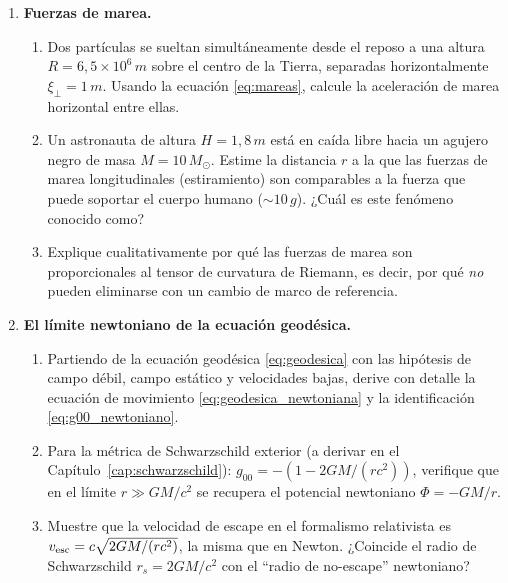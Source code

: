 \begin{enumerate}[leftmargin=2em, label=\textbf{P\thechapter.\arabic*.}]
  \item \textbf{Fuerzas de marea.}
  \begin{enumerate}[label=(\alph*)]
    \item Dos partículas se sueltan simultáneamente desde el reposo a una altura $R = 6{,}5\times10^6\,\si{m}$ sobre el centro de la Tierra, separadas horizontalmente $\xi_\perp = 1\,\si{m}$. Usando la ecuación \eqref{eq:mareas}, calcule la aceleración de marea horizontal entre ellas.
    \item Un astronauta de altura $H = 1{,}8\,\si{m}$ está en caída libre hacia un agujero negro de masa $M = 10\,M_\odot$. Estime la distancia $r$ a la que las fuerzas de marea longitudinales (estiramiento) son comparables a la fuerza que puede soportar el cuerpo humano ($\sim 10\,g$). ¿Cuál es este fenómeno conocido como?
    \item Explique cualitativamente por qué las fuerzas de marea son proporcionales al tensor de curvatura de Riemann, es decir, por qué \emph{no} pueden eliminarse con un cambio de marco de referencia.
  \end{enumerate}

  \item \textbf{El límite newtoniano de la ecuación geodésica.}
  \begin{enumerate}[label=(\alph*)]
    \item Partiendo de la ecuación geodésica \eqref{eq:geodesica} con las hipótesis de campo débil, campo estático y velocidades bajas, derive con detalle la ecuación de movimiento \eqref{eq:geodesica_newtoniana} y la identificación \eqref{eq:g00_newtoniano}.
    \item Para la métrica de Schwarzschild exterior (a derivar en el Capítulo~\ref{cap:schwarzschild}):
    $g_{00} = -(1 - 2GM/(rc^2))$, verifique que en el límite $r \gg GM/c^2$ se recupera el potencial newtoniano $\Phi = -GM/r$.
    \item Muestre que la velocidad de escape en el formalismo relativista es $v_{\rm esc} = c\sqrt{2GM/(rc^2)}$, la misma que en Newton. ¿Coincide el radio de Schwarzschild $r_s = 2GM/c^2$ con el ``radio de no-escape'' newtoniano?
  \end{enumerate}


\end{enumerate}
